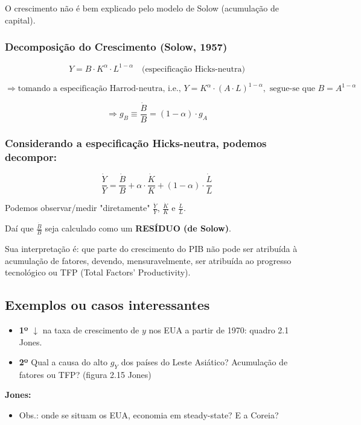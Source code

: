 \documentclass[a4paper,12pt]{article}[abntex2]
\begin{document}
O crescimento não é bem explicado pelo modelo de Solow (acumulação de capital).

\subsubsection{\textbf{Decomposição do Crescimento (Solow, 1957)}}

\[
Y = B \cdot K^{\alpha} \cdot L^{1-\alpha} \quad \text{(especificação Hicks-neutra)}
\]

\[
\Rightarrow \text{tomando a especificação Harrod-neutra, i.e., } Y = K^\alpha \cdot (A \cdot L)^{1-\alpha}, \text{ segue-se que } B = A^{1-\alpha}
\]

\[
\Rightarrow g_B \equiv \frac{\dot{B}}{B} = (1-\alpha) \cdot g_A
\]

\subsubsection{\textbf{Considerando a especificação Hicks-neutra, podemos decompor:}}

\[
\frac{\dot{Y}}{Y} = \frac{\dot{B}}{B} + \alpha \cdot \frac{\dot{K}}{K} + (1-\alpha) \cdot \frac{\dot{L}}{L}
\]

Podemos observar/medir "diretamente" \( \frac{\dot{Y}}{Y} \), \( \frac{\dot{K}}{K} \) e \( \frac{\dot{L}}{L} \).

Daí que \( \frac{\dot{B}}{B} \) seja calculado como um \textbf{RESÍDUO (de Solow)}.

Sua interpretação é: que parte do crescimento do PIB não pode ser atribuída à acumulação de fatores, devendo, mensuravelmente, ser atribuída ao progresso tecnológico ou TFP (Total Factors' Productivity).

\subsection{\textbf{Exemplos ou casos interessantes}}

\begin{itemize}
    \item \textbf{1º} \( \downarrow \) na taxa de crescimento de \( y \) nos EUA a partir de 1970: quadro 2.1 Jones.
    \item \textbf{2º} Qual a causa do alto \( g_Y \) dos países do Leste Asiático? Acumulação de fatores ou TFP? (figura 2.15 Jones)
\end{itemize}

\textbf{Jones:} 
\begin{itemize}
    \item Obs.: onde se situam os EUA, economia em steady-state? E a Coreia?
\end{itemize}
\end{document}
